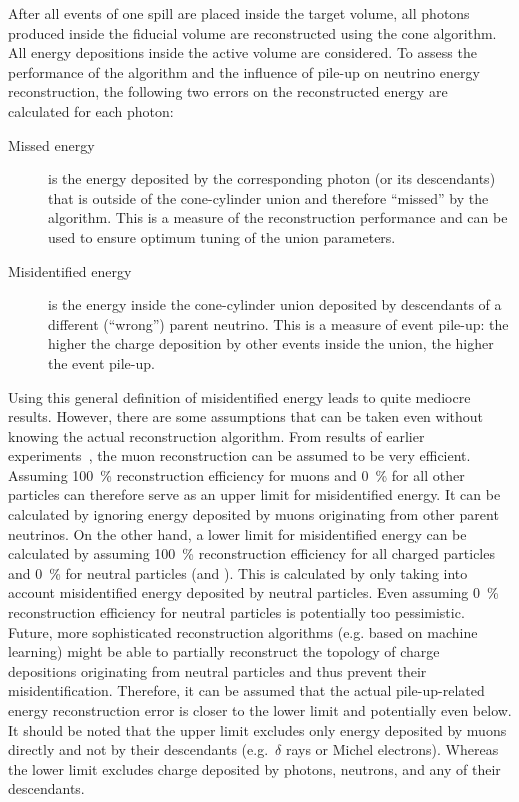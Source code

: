 After all events of one spill are placed inside the target volume, all \Pgpz photons produced inside the fiducial volume are reconstructed using the cone algorithm.
All energy depositions inside the active volume are considered.
To assess the performance of the algorithm and the influence of pile-up on neutrino energy reconstruction, the following two errors on the reconstructed energy are calculated for each \Pgpz photon:
\begin{description}
	\item[Missed energy] is the energy deposited by the corresponding \Pgpz photon (or its descendants) that is outside of the cone-cylinder union and therefore ``missed'' by the algorithm.
		This is a measure of the reconstruction performance and can be used to ensure optimum tuning of the union parameters.
	\item[Misidentified energy] is the energy inside the cone-cylinder union deposited by descendants of a different (``wrong'') parent neutrino.
		This is a measure of event pile-up: the higher the charge deposition by other events inside the union, the higher the event pile-up.
\end{description}
Using this general definition of misidentified energy leads to quite mediocre results.
However, there are some assumptions that can be taken even without knowing the actual reconstruction algorithm.
From results of earlier experiments~\cite{pandora}, the muon reconstruction can be assumed to be very efficient.
Assuming \SI{100}{\percent} reconstruction efficiency for muons and \SI{0}{\percent} for all other particles can therefore serve as an upper limit for misidentified energy.
It can be calculated by ignoring energy deposited by muons originating from other parent neutrinos.
On the other hand, a lower limit for misidentified energy can be calculated by assuming \SI{100}{\percent} reconstruction efficiency for all charged particles and \SI{0}{\percent} for neutral particles (\Pgpz and \Pgg).
This is calculated by only taking into account misidentified energy deposited by neutral particles.
Even assuming \SI{0}{\percent} reconstruction efficiency for neutral particles is potentially too pessimistic.
Future, more sophisticated reconstruction algorithms (e.g. based on machine learning) might be able to partially reconstruct the topology of charge depositions originating from neutral particles and thus prevent their misidentification.
Therefore, it can be assumed that the actual pile-up-related energy reconstruction error is closer to the lower limit and potentially even below.
It should be noted that the upper limit excludes only energy deposited by muons directly and not by their descendants (e.g.\ $\delta$ rays or Michel electrons).
Whereas the lower limit excludes charge deposited by photons, neutrons, and any of their descendants.

